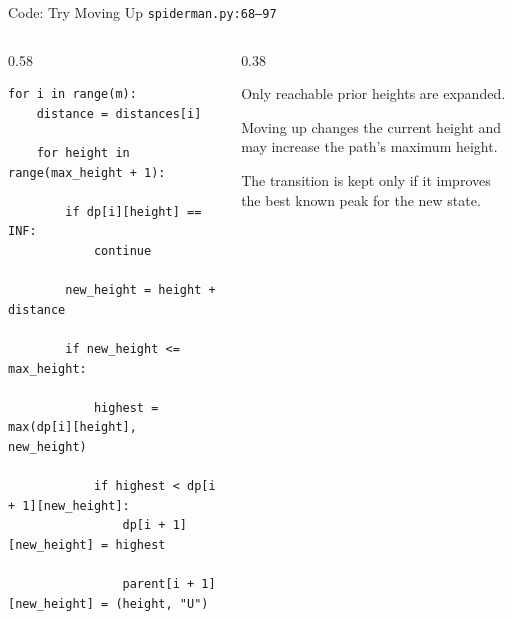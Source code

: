 \documentclass[aspectratio=169,11pt]{beamer}
\begin{document}
\begin{frame}[fragile]{Code: Try Moving Up}
\scriptsize
{} \texttt{spiderman.py:68--97}

\vspace{0.08cm}
\begin{columns}[T,totalwidth=\textwidth]
\begin{column}{0.58\textwidth}
\begin{lstlisting}[style=cpcode]
for i in range(m):
    distance = distances[i]

    for height in range(max_height + 1):

        if dp[i][height] == INF:
            continue

        new_height = height + distance

        if new_height <= max_height:

            highest = max(dp[i][height], new_height)

            if highest < dp[i + 1][new_height]:
                dp[i + 1][new_height] = highest

                parent[i + 1][new_height] = (height, "U")
\end{lstlisting}
\end{column}
\begin{column}{0.38\textwidth}
\begin{tightitemize}
  \item Only reachable prior heights are expanded.
  \item Moving up changes the current height and may increase the path's maximum height.
  \item The transition is kept only if it improves the best known peak for the new state.
\end{tightitemize}
\end{column}
\end{columns}
\end{frame}
\end{document}

